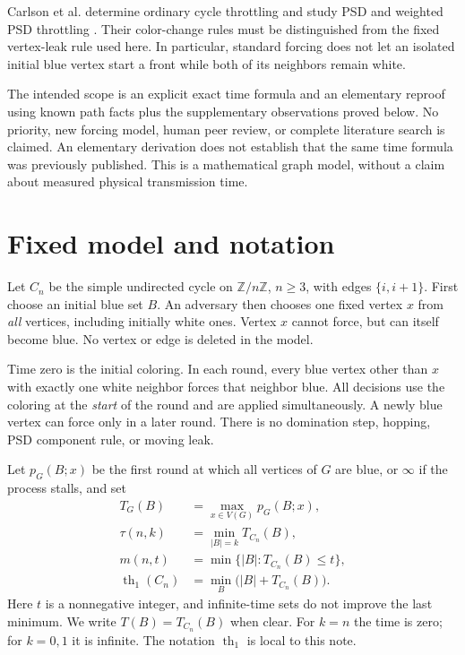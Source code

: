 \documentclass[11pt,a4paper]{article}
\newcommand{\thone}{\operatorname{th}_1}
\begin{document}
Carlson et al. determine ordinary cycle throttling and study PSD and weighted
PSD throttling \cite[Sections 6--7]{Carlson2019}. Their color-change rules
must be distinguished from the fixed vertex-leak rule used here. In
particular, standard forcing does not let an isolated initial blue vertex
start a front while both of its neighbors remain white.

The intended scope is an explicit exact time formula and an elementary
reproof using known path facts plus the supplementary observations proved
below. No priority, new forcing model, human peer review, or complete
literature search is claimed. An elementary derivation does not establish
that the same time formula was previously published. This is a mathematical
graph model, without a claim about measured physical transmission time.

\section{Fixed model and notation}

Let $C_n$ be the simple undirected cycle on $\mathbb Z/n\mathbb Z$, $n\geq3$,
with edges $\{i,i+1\}$. First choose an initial blue set $B$. An adversary then
chooses one fixed vertex $x$ from \emph{all} vertices, including initially
white ones. Vertex $x$ cannot force, but can itself become blue. No vertex or
edge is deleted in the model.

Time zero is the initial coloring. In each round, every blue vertex other
than $x$ with exactly one white neighbor forces that neighbor blue. All
decisions use the coloring at the \emph{start} of the round and are applied
simultaneously. A newly blue vertex can force only in a later round.
There is no domination step, hopping, PSD component rule, or moving leak.

Let $p_G(B;x)$ be the first round at which all vertices of $G$ are blue, or
$\infty$ if the process stalls, and set
\begin{align*}
 T_G(B)&=\max_{x\in V(G)}p_G(B;x),\\
 \tau(n,k)&=\min_{|B|=k}T_{C_n}(B),\\
 m(n,t)&=\min\{|B|:T_{C_n}(B)\leq t\},\\
 \thone(C_n)&=\min_B\bigl(|B|+T_{C_n}(B)\bigr).
\end{align*}
Here $t$ is a nonnegative integer, and infinite-time sets do not improve the
last minimum. We write $T(B)=T_{C_n}(B)$ when clear. For $k=n$ the time is
zero; for $k=0,1$ it is infinite. The notation $\thone$ is local to this note.
\end{document}
